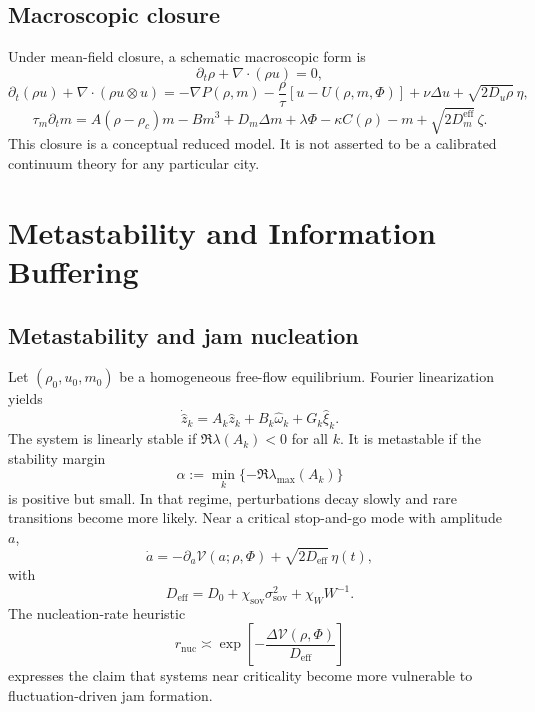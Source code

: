 \documentclass[11pt]{article}
\begin{document}
\subsection{Macroscopic closure}
Under mean-field closure, a schematic macroscopic form is
\begin{equation}
\partial_t\rho+\nabla\!\cdot(\rho u)=0,
\end{equation}
\begin{equation}
\partial_t(\rho u)+\nabla\!\cdot(\rho u\otimes u)=-\nabla P(\rho,m)-\frac{\rho}{\tau}[u-U(\rho,m,\Phi)]+\nu\Delta u+\sqrt{2D_u\rho}\,\eta,
\end{equation}
\begin{equation}
\tau_m\partial_t m=A(\rho-\rho_c)m-Bm^3+D_m\Delta m+\lambda\Phi-\kappa C(\rho)-m+\sqrt{2D_m^{\mathrm{eff}}}\,\zeta.
\end{equation}
This closure is a conceptual reduced model. It is not asserted to be a calibrated continuum theory for any particular city.

\section{Metastability and Information Buffering}
\subsection{Metastability and jam nucleation}
Let $(\rho_0,u_0,m_0)$ be a homogeneous free-flow equilibrium. Fourier linearization yields
\begin{equation}
\dot{\hat z}_k=A_k\hat z_k+B_k\hat\omega_k+G_k\hat\xi_k.
\end{equation}
The system is linearly stable if $\Re\lambda(A_k)<0$ for all $k$. It is metastable if the stability margin
\begin{equation}
\alpha:=\min_k\{-\Re\lambda_{\max}(A_k)\}
\end{equation}
is positive but small. In that regime, perturbations decay slowly and rare transitions become more likely. Near a critical stop-and-go mode with amplitude $a$,
\begin{equation}
\dot{a}=-\partial_a\mathcal V(a;\rho,\Phi)+\sqrt{2D_{\mathrm{eff}}}\,\eta(t),
\end{equation}
with
\begin{equation}
D_{\mathrm{eff}}=D_0+\chi_{\mathrm{sov}}\sigma_{\mathrm{sov}}^2+\chi_W W^{-1}.
\end{equation}
The nucleation-rate heuristic
\begin{equation}
r_{\mathrm{nuc}}\asymp\exp\!\left[-\frac{\Delta\mathcal V(\rho,\Phi)}{D_{\mathrm{eff}}}\right]
\end{equation}
expresses the claim that systems near criticality become more vulnerable to fluctuation-driven jam formation.
\end{document}
